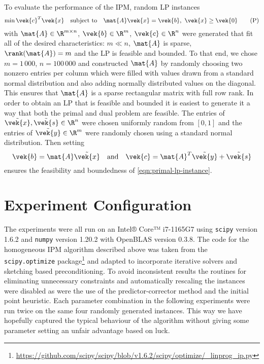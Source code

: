 To evaluate the performance of the IPM, random LP instances 
\begin{equation}\label{eqn:primal-lp-instance}
  \min \vek{c}^T \vek{x} \quad \text{subject to} \quad \mat{A}\vek{x} = \vek{b}, \ \vek{x} \geq \vek{0} \tag{P}
 \end{equation}
with \(\mat{A} \in \R^{m \times n}\), \(\vek{b} \in \R^m\), \(\vek{c} \in \R^n\) were generated that fit all of the desired characteristics: \(m \ll n\), \(\mat{A}\) is sparse, \(\rank(\mat{A}) = m\) and the LP is feasible and bounded.
To that end, we chose \(m = 1\,000\), \(n = 100\,000\) and constructed \(\mat{A}\) by randomly choosing two nonzero entries per column which were filled with values drawn from a standard normal distribution and also adding normally distributed values on the diagonal.
This ensures that \(\mat{A}\) is a sparse rectangular matrix with full row rank.
In order to obtain an LP that is feasible and bounded it is easiest to generate it a way that both the primal and dual problem are feasible.
The entries of \(\tilde{\vek{x}}, \tilde{\vek{s}} \in \R^n\) were chosen uniformly random from \([0, 1]\) and the entries of \(\tilde{\vek{y}} \in \R^m\) were randomly chosen using a standard normal distribution.
Then setting
\begin{equation}
  \vek{b} = \mat{A} \tilde{\vek{x}} \quad \text{and} \quad \vek{c} = \mat{A}^T \tilde{\vek{y}} + \tilde{\vek{s}}
\end{equation}
ensures the feasibility and boundedness of \cref{eqn:primal-lp-instance}.

\section{Experiment Configuration}

The experiments were all run on an Intel® Core™ i7-1165G7 using \texttt{scipy} version 1.6.2 and \texttt{numpy} version 1.20.2 with OpenBLAS version 0.3.8.
The code for the homogeneous IPM algorithm described above was taken from the \texttt{scipy.optimize} package\footnote{\url{https://github.com/scipy/scipy/blob/v1.6.2/scipy/optimize/_linprog_ip.py}} and adapted to incorporate iterative solvers and sketching based preconditioning.
To avoid inconsistent results the routines for eliminating unnecessary constraints and automatically rescaling the instances were disabled as were the use of the predictor-corrector method and the initial point heuristic.
Each parameter combination in the following experiments were run twice on the same four randomly generated instances.
This way we have hopefully captured the typical behaviour of the algorithm without giving some parameter setting an unfair advantage based on luck.
